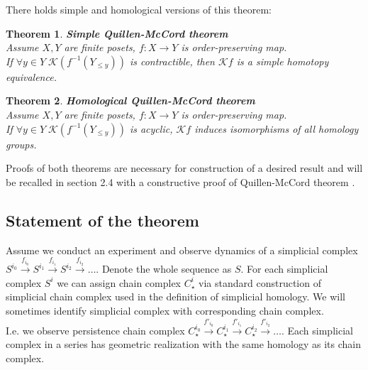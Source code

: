 \documentclass[a4paper, 12pt]{article}
\newtheorem{theorem}{Theorem}
\theoremstyle{definition}
\theoremstyle{remark}
\begin{document}
There holds simple {\cite[Theorem 1.2]{Bar11}} and homological {\cite[Corollary 5.5]{Bar11}} versions of this theorem:

\begin{theorem} \textbf{Simple Quillen-McCord theorem}\\
  Assume $X, Y$ are finite posets, $f : X \to Y$ is order-preserving map.\\
  If $\forall y \in Y\;\mathcal{K}(f^{-1}(Y_{\leqslant y}))$ is contractible, then $\mathcal{K}f$ is a simple homotopy equivalence.\\
\end{theorem}

\begin{theorem} \textbf{Homological Quillen-McCord theorem}\\
  Assume $X, Y$ are finite posets, $f : X \to Y$ is order-preserving map.\\
  If $\forall y \in Y\;\mathcal{K}(f^{-1}(Y_{\leqslant y}))$ is acyclic, $\mathcal{K}f$ induces isomorphisms of all homology groups.\\
\end{theorem}

Proofs of both theorems are necessary for construction of a desired result and will be recalled in section 2.4 with a constructive proof of Quillen-McCord theorem {\cite[Proof of Theorem 1.1]{Bar11}}.\\

\subsection{Statement of the theorem}

Assume we conduct an experiment and observe dynamics of a simplicial complex $S^{i_0} \xrightarrow{f_{i_0}} S^{i_1} \xrightarrow{f_{i_1}} S^{i_2} \xrightarrow{f_{i_2}} \ldots$. Denote the whole sequence as $S$. For each simplicial complex $S^{i}$ we can assign chain complex $C_{\star}^{i}$ via standard construction of simplicial chain complex used in the definition of simplicial homology. We will sometimes identify simplicial complex with corresponding chain complex.\\

I.e. we observe persistence chain complex $C_{\star}^{i_0} \xrightarrow{f'_{i_0}} C_{\star}^{i_1} \xrightarrow{f'_{i_1}} C_{\star}^{i_2} \xrightarrow{f'_{i_2}} \ldots$. Each simplicial complex in a series has geometric realization with the same homology as its chain complex.
\end{document}
